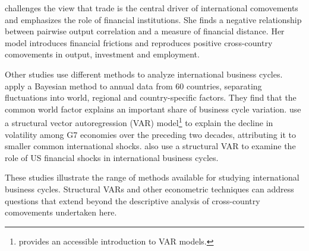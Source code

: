 \cite{Faia:2007aa} challenges the view that trade is the central driver of international comovements and emphasizes the role of financial institutions. She finds a negative relationship between pairwise output correlation and a measure of financial distance. Her model introduces financial frictions and reproduces positive cross-country comovements in output, investment and employment.

Other studies use different methods to analyze international business cycles. \cite{Kose:2003aa} apply a Bayesian method to annual data from 60 countries, separating fluctuations into world, regional and country-specific factors. They find that the common world factor explains an important share of business cycle variation. \cite{Stock:2003aa} use a structural vector autoregression (VAR) model\footnote{\cite{Webb:1999aa} provides an accessible introduction to VAR models.} to explain the decline in volatility among G7 economies over the preceding two decades, attributing it to smaller common international shocks. \cite{Fund:2010aa} also use a structural VAR to examine the role of US financial shocks in international business cycles.

These studies illustrate the range of methods available for studying international business cycles. Structural VARs and other econometric techniques can address questions that extend beyond the descriptive analysis of cross-country comovements undertaken here.